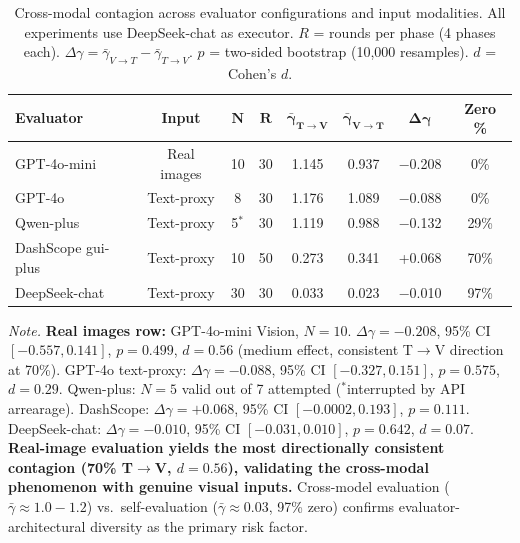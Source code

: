 \begin{table}[ht]
\centering
\caption{Cross-modal contagion across evaluator configurations and input modalities. All experiments use DeepSeek-chat as executor. $R$ = rounds per phase (4 phases each). $\Delta\gamma = \bar{\gamma}_{V\to T} - \bar{\gamma}_{T\to V}$. $p$ = two-sided bootstrap (10,000 resamples). $d$ = Cohen's $d$.}
\label{tab:statistical}
\begin{tabular}{lccccccc}
\toprule
\textbf{Evaluator} & \textbf{Input} & $\mathbf{N}$ & $\mathbf{R}$ & $\mathbf{\bar{\gamma}_{T\to V}}$ & $\mathbf{\bar{\gamma}_{V\to T}}$ & $\mathbf{\Delta\gamma}$ & \textbf{Zero \%} \\
\midrule
GPT-4o-mini       & Real images  & 10    & 30  & 1.145  & 0.937  & $-$0.208  & 0\% \\
GPT-4o            & Text-proxy   & 8     & 30  & 1.176  & 1.089  & $-$0.088  & 0\% \\
Qwen-plus         & Text-proxy   & 5$^*$ & 30  & 1.119  & 0.988  & $-$0.132  & 29\% \\
DashScope gui-plus & Text-proxy  & 10    & 50  & 0.273  & 0.341  & +0.068  & 70\% \\
DeepSeek-chat     & Text-proxy   & 30    & 30  & 0.033  & 0.023  & $-$0.010  & 97\% \\
\bottomrule
\end{tabular}

\vspace{4pt}
\begin{minipage}{\textwidth}
\footnotesize
\textit{Note.} \textbf{Real images row:} GPT-4o-mini Vision, $N{=}10$. $\Delta\gamma{=}{-}0.208$, 95\% CI $[{-}0.557,0.141]$, $p{=}0.499$, $d{=}0.56$ (medium effect, consistent T$\to$V direction at 70\%). GPT-4o text-proxy: $\Delta\gamma{=}{-}0.088$, 95\% CI $[{-}0.327,0.151]$, $p{=}0.575$, $d{=}0.29$. Qwen-plus: $N{=}5$ valid out of 7 attempted ($^*$interrupted by API arrearage). DashScope: $\Delta\gamma{=}{+}0.068$, 95\% CI $[{-}0.0002,0.193]$, $p{=}0.111$. DeepSeek-chat: $\Delta\gamma{=}{-}0.010$, 95\% CI $[{-}0.031,0.010]$, $p{=}0.642$, $d{=}0.07$. \textbf{Real-image evaluation yields the most directionally consistent contagion (70\% T$\to$V, $d{=}0.56$), validating the cross-modal phenomenon with genuine visual inputs.} Cross-model evaluation ($\bar{\gamma}{\approx}1.0{-}1.2$) vs.\ self-evaluation ($\bar{\gamma}{\approx}0.03$, 97\% zero) confirms evaluator-architectural diversity as the primary risk factor.
\end{minipage}
\end{table}
